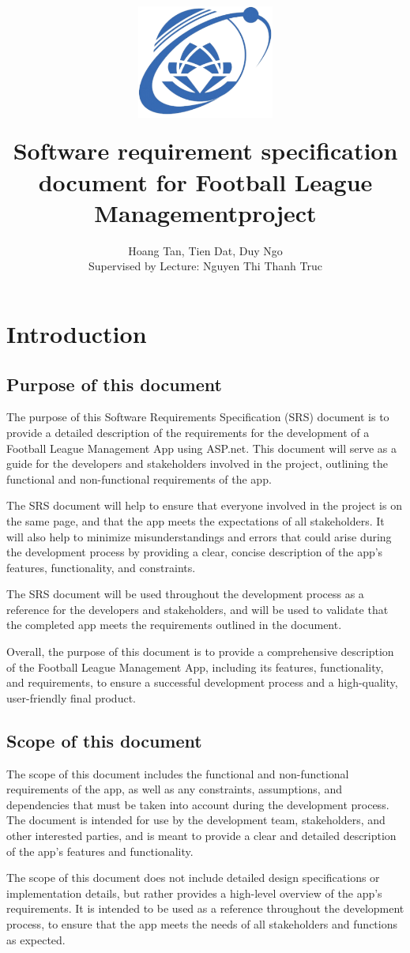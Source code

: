 \documentclass[12pt]{article}
\title{
{\includegraphics[width=4.5cm, height=4.5cm]{Figs/logo-uit-300x248.png}
}
\\
{Software requirement specification document for Football League Managementproject}
}
\author{Hoang Tan, Tien Dat, Duy Ngo \\ Supervised by Lecture: Nguyen Thi Thanh Truc }
\begin{document}
\maketitle

\section{Introduction}
\subsection{Purpose of this document}
The purpose of this Software Requirements Specification (SRS) document is to provide a detailed description of the requirements for the development of a Football League Management App using ASP.net. This document will serve as a guide for the developers and stakeholders involved in the project, outlining the functional and non-functional requirements of the app.

The SRS document will help to ensure that everyone involved in the project is on the same page, and that the app meets the expectations of all stakeholders. It will also help to minimize misunderstandings and errors that could arise during the development process by providing a clear, concise description of the app's features, functionality, and constraints.

The SRS document will be used throughout the development process as a reference for the developers and stakeholders, and will be used to validate that the completed app meets the requirements outlined in the document.

Overall, the purpose of this document is to provide a comprehensive description of the Football League Management App, including its features, functionality, and requirements, to ensure a successful development process and a high-quality, user-friendly final product.
\subsection{ Scope of this document}
The scope of this document includes the functional and non-functional requirements of the app, as well as any constraints, assumptions, and dependencies that must be taken into account during the development process. The document is intended for use by the development team, stakeholders, and other interested parties, and is meant to provide a clear and detailed description of the app's features and functionality.

The scope of this document does not include detailed design specifications or implementation details, but rather provides a high-level overview of the app's requirements. It is intended to be used as a reference throughout the development process, to ensure that the app meets the needs of all stakeholders and functions as expected.
\end{document}
